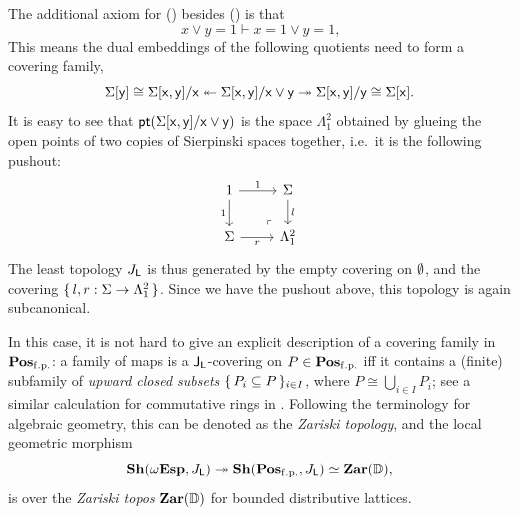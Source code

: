 \begin{example}[\AxiomL]
  The additional axiom for (\AxiomL) besides (\AxiomNT) is that 
  \[ x \vee y = 1 \vdash x = 1 \vee y = 1\text{,} \] 
  This means the dual embeddings of the following quotients need to form a covering family,
  \[ \Sigma[\ms{y}] \cong \Sigma[\ms{x},\ms{y}]/\ms{x} \twoheadleftarrow \Sigma[\ms{x},\ms{y}]/\ms{x}\vee \ms{y} \surj \Sigma[\ms{x},\ms{y}]/\ms{y} \cong \Sigma[\ms{x}]\text{.} \]
  It is easy to see that $\mathsf{pt}(\Sigma[\mathsf{x},\mathsf{y}]/\mathsf{x} \vee \mathsf{y})$ is the space $\Lambda^2_1$ obtained by glueing the open points of two copies of Sierpinski spaces together, i.e.\ it is the following pushout:
  \[
  \begin{tikzcd}
    1 \ar[d, "1"'] \ar[r, "1"] & \Sigma \ar[d, "l"] \\ 
    \Sigma \ar[r, "r"'] & \Lambda^2_1
    \arrow["\lrcorner"{anchor=center, pos=0.125, rotate=180}, draw=none, from=2-2, to=1-1]    
  \end{tikzcd}
  \]
  The least topology $J_{\mathsf{L}}$ is thus generated by the empty covering on $\emptyset$, and the covering $\{\,l,r : \Sigma \to \Lambda^2_1\,\}$. Since we have the pushout above, this topology is again subcanonical. 
  
  In this case, it is not hard to give an explicit description of a covering family in $\mathbf{Pos}_{\mathrm{f.p.}}$: a family of maps is a $\mathsf{J}_{\mathsf{L}}$-covering on $P \in \mathbf{Pos}_{\mathrm{f.p.}}$ iff it contains a (finite) subfamily of \emph{upward closed subsets} $\{\,P_i\subseteq P\,\}_{i\in I}$, where $P \cong \bigcup_{i\in I}P_i$; see a similar calculation for commutative rings in \citet[VIII. 6]{maclane1992sheaves}. Following the terminology for algebraic geometry, this can be denoted as the \emph{Zariski topology}, and the local geometric morphism
  \[ \sh(\wTop,J_{\ms L}) \surj \sh(\Pos\fp,J_{\ms L}) \simeq \mb{Zar}(\mbb D)\text{,} \]
  is over the \emph{Zariski topos} $\mathbf{Zar}(\mathbb{D})$ for bounded distributive lattices.
\end{example}

